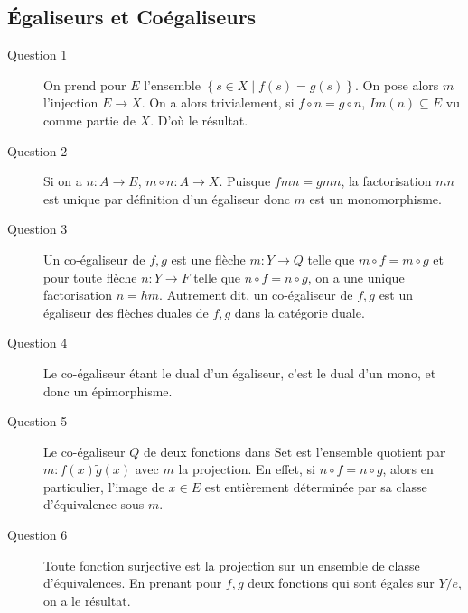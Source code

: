 \documentclass[math, info]{cours}
\begin{document}
\subsection{Égaliseurs et Coégaliseurs}
\begin{description}
	\item[Question 1] On prend pour $E$ l'ensemble $\left\{s \in X\mid f(s) = g(s) \right\}$. On pose alors $m$ l'injection $E \to X$.
	      On a alors trivialement, si $f\circ n = g\circ n$, $Im(n) \subseteq E$ vu comme partie de $X$.
	      D'où le résultat.
	\item[Question 2] Si on a $n: A \to E$, $m\circ n: A \to X$. Puisque $fmn = gmn$, la factorisation $mn$ est unique par définition d'un égaliseur donc $m$ est un monomorphisme.
	\item[Question 3] Un co-égaliseur de $f, g$ est une flèche $m : Y \to Q$ telle que $m\circ f = m\circ g$ et pour toute flèche $n: Y \to F$ telle que $n \circ f = n \circ g$, on a une unique factorisation $n = hm$.
	      Autrement dit, un co-égaliseur de $f, g$ est un égaliseur des flèches duales de $f, g$ dans la catégorie duale.
	\item[Question 4] Le co-égaliseur étant le dual d'un égaliseur, c'est le dual d'un mono, et donc un épimorphisme.
	\item[Question 5] Le co-égaliseur $Q$ de deux fonctions dans $\mathrm{Set}$ est l'ensemble quotient par $m: f(x) \tilde g(x)$ avec $m$ la projection.
	      En effet, si $n \circ f = n\circ g$, alors en particulier, l'image de $x \in E$ est entièrement déterminée par sa classe d'équivalence sous $m$.
	\item[Question 6] Toute fonction surjective est la projection sur un ensemble de classe d'équivalences.
	      En prenant pour $f, g$ deux fonctions qui sont égales sur $Y / e$, on a le résultat.
\end{description}
\end{document}
